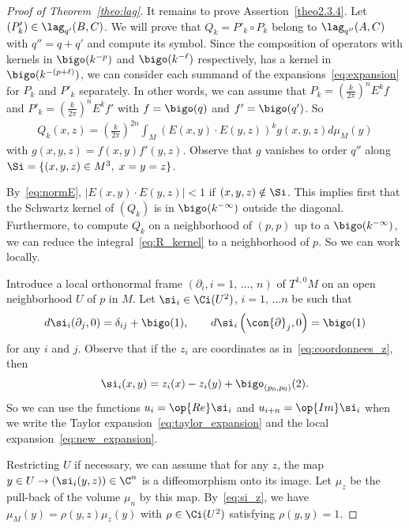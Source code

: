 \begin{proof}[Proof of Theorem~\ref{theo:lag}]
It remains to prove Assertion~\eqref{theo2.3.4}. Let $(P'_k) \in
\lag_{q'} (B,C)$. We will prove that $Q_k = P'_k \circ P_k$ belong to $\lag _{q'' } (A,C)$ with $q'' = q + q'$ and compute its symbol. Since the composition of operators with kernels in $\bigo (k^{-p})$ and $\bigo (k^{-\ell})$ respectively, has a kernel in $\bigo (k^{-(p+\ell)})$, we can consider each summand of the expansions~\eqref{eq:expansion} for $P_k$ and $P'_k$ separately. In other words, we can assume that $P_k = (\frac{k}{2\pi} )^n E^k f$ and $P'_k = (\frac{k}{2\pi})^n E^k f'$ with $f = \bigo (q)$ and $f' = \bigo (q')$. So
\begin{gather}\label{eq:R_kernel}
Q_k (x,z) = \left(\frac{k}{2\pi} \right)^{2n} \int_M (E(x,y) \cdot E(y,z))^k g(x,y,z) d \mu_M (y)
\end{gather}
with $g(x,y,z) = f(x,y) f' (y,z)$. Observe that $g$ vanishes to order $q''$ along $\Si = \{ (x,y,z) \in M^3, \; x= y = z \}$.



By~\eqref{eq:normE}, $|E(x,y) \cdot E(y,z) | < 1 $ if $(x,y,z) \notin \Si$. This implies first that the Schwartz kernel of $(Q_k)$ is in $\bigo (k^{-\infty})$ outside the diagonal. Furthermore, to compute $Q_k$ on a neighborhood of $(p,p)$ up to a $\bigo (k^{-\infty})$, we can reduce the integral~\eqref{eq:R_kernel} to a neighborhood of $p$. So we can work locally.

Introduce a local orthonormal frame $(\partial_i, i =1,\, \ldots,\, n)$ of $T^{1,0}M$ on an open neighborhood $U$ of $p$ in $M$. Let $\si_i \in \Ci (U^2)$, $i =1,\,\ldots n$ be such that
\begin{gather}\label{eq:dsi_i--partial_j}
d\si_i (\partial_j, 0) = \delta_{ij} + \bigo (1), \qquad d\si_i \left(\con{\partial}_j, 0\right) = \bigo (1)
\end{gather}
for any $i$ and $j$. Observe that if the $z_i$ are coordinates as in~\eqref{eq:coordonnees_z}, then
\begin{gather}\label{eq:si_z}
\si_i (x,y) = z_i(x) - z_i (y) + \bigo_{(p_0, p_0)} (2).
\end{gather}
So we can use the functions $u_i = \op{Re} \si _i$ and $u_{i+n} = \op{Im} \si_i$ when we write the Taylor expansion~\eqref{eq:taylor_expansion} and the local expansion~\eqref{eq:new_expansion}.



Restricting $U$ if necessary, we can assume that for any $z$, the map $ y\in U \rightarrow (\si_i (y,z)) \in \C^n$ is a diffeomorphism onto its image. Let $\mu_z$ be the pull-back of the volume $\mu_n $ by this map. By~\eqref{eq:si_z}, we have $\mu_M (y) = \rho (y,z) \mu_z (y)$ with $\rho \in \Ci (U^2)$ satisfying $\rho (y,y) = 1$.


\end{proof}

